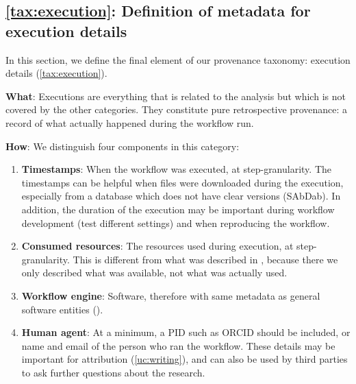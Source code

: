 \subsection{\ref{tax:execution}: Definition of metadata for execution details}
\label{sec:execution_reqs}

In this section, we define the final element of our provenance taxonomy: execution details (\ref{tax:execution}).

\textbf{What}: Executions are everything that is related to the analysis but which is not covered by the other categories. They constitute pure retrospective provenance: a record of what actually happened during the workflow run. 

\textbf{How}: We distinguish four components in this category:

\begin{enumerate}[label=\textbf{EX\arabic*}]
    \item \textbf{Timestamps}: When the workflow was executed, at step-granularity. The timestamps can be helpful when files were downloaded during the execution, especially from a database which does not have clear versions (SAbDab). In addition, the duration of the execution may be important during workflow development (test different settings) and when reproducing the workflow. \label{req:ex_time}
    \item \textbf{Consumed resources}: The resources used during execution, at step-granularity. This is different from what was described in , because there we only described what was available, not what was actually used. \label{req:ex_resources}
    \item \textbf{Workflow engine}: Software, therefore with same metadata as general software entities ().\label{req:ex_engine}
    \item \textbf{Human agent}: At a minimum, a PID such as ORCID should be included, or name and email of the person who ran the workflow. These details may be important for attribution (\ref{uc:writing}), and can also be used by third parties to ask further questions about the research.  \label{req:ex_human}
\end{enumerate}